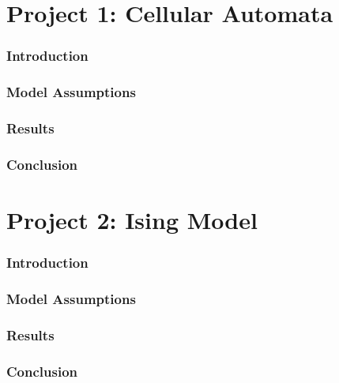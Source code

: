 \documentclass[12pt,letterpaper,cm]{article}
\renewcommand{\.}{\cdot}
\newcommand{\<}{\langle}
\renewcommand{\>}{\rangle}
\begin{document}
	
	\part*{Project 1: Cellular Automata}
	
	
	\section*{Introduction}
	
	
	
	\section*{Model Assumptions}
	
	
	
	\section*{Results}	
	
	
	
	\section*{Conclusion}
	
	
	
	
	
	
	\part*{Project 2: Ising Model}
	
	
	\section*{Introduction}
	
	
	
	\section*{Model Assumptions}
	
	
	
	\section*{Results}	
	
	
	
	\section*{Conclusion}
	
\end{document}
